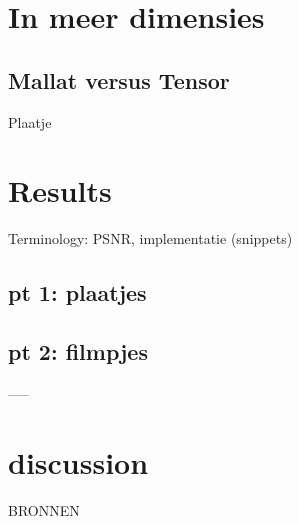 \documentclass[11pt]{amsart}
\begin{document}
\section{In meer dimensies}

\subsection{Mallat versus Tensor}
Plaatje

\section{Results}
Terminology: PSNR, implementatie (snippets)

\subsection{pt 1: plaatjes}
\subsection{pt 2: filmpjes}

-----

\section{discussion}

BRONNEN
\end{document}
